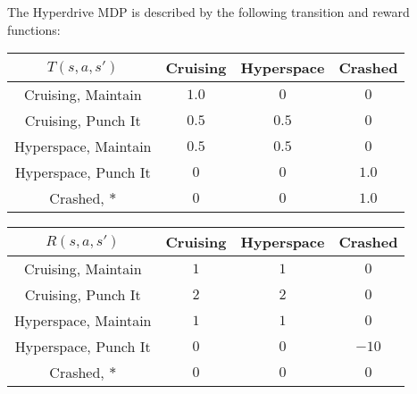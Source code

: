 \documentclass{worksheet}
\begin{document}



\pagebreak

\begin{question}
The Hyperdrive MDP is described by the following transition and reward functions:

\begin{center}
\begin{tabular}{c|ccc}
$T(s, a, s')$ & Cruising & Hyperspace & Crashed \\
\hline
Cruising, Maintain & $1.0$ & $0$ & $0$ \\
Cruising, Punch It & $0.5$ & $0.5$ & $0$ \\
Hyperspace, Maintain & $0.5$ & $0.5$ & $0$ \\
Hyperspace, Punch It & $0$ & $0$ & $1.0$ \\
Crashed, $*$ & $0$ & $0$ & $1.0$ \\
\end{tabular}
\end{center}

\begin{center}
\begin{tabular}{c|ccc}
$R(s, a, s')$ & Cruising & Hyperspace & Crashed \\
\hline
Cruising, Maintain & $1$ & $1$ & $0$ \\
Cruising, Punch It & $2$ & $2$ & $0$ \\
Hyperspace, Maintain & $1$ & $1$ & $0$ \\
Hyperspace, Punch It & $0$ & $0$ & $-10$ \\
Crashed, $*$ & $0$ & $0$ & $0$ \\
\end{tabular}
\end{center}


\end{question}
\end{document}
